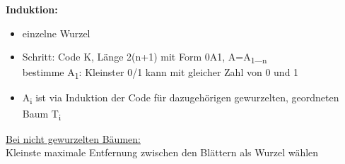 \textbf{Induktion:}
\begin{itemize}
	\item einzelne Wurzel \grqq{}
	\item Schritt: Code K, Länge 2(n+1) mit Form 0A1, A=A\textsubscript{1}\_\textsubscript{n}\\
bestimme A\textsubscript{1}: Kleinster 0/1 kann mit gleicher Zahl von 0 und 1
	\item A\textsubscript{i} ist via Induktion der Code für dazugehörigen gewurzelten, geordneten Baum T\textsubscript{i}
\end{itemize}

\underline{Bei nicht gewurzelten Bäumen:}\\
\glqq Kleinste maximale Entfernung zwischen den Blättern als Wurzel wählen\grqq{}
